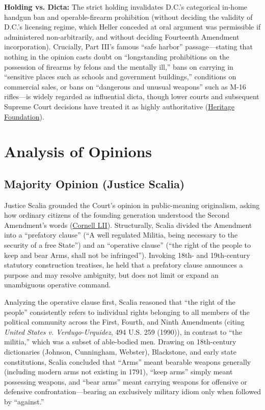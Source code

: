 \documentclass[12pt]{article}
\begin{document}
\textbf{Holding vs. Dicta:} The strict holding invalidates D.C.'s categorical in-home handgun ban and operable-firearm prohibition (without deciding the validity of D.C.'s licensing regime, which Heller conceded at oral argument was permissible if administered non-arbitrarily, and without deciding Fourteenth Amendment incorporation). Crucially, Part III's famous ``safe harbor'' passage---stating that nothing in the opinion casts doubt on ``longstanding prohibitions on the possession of firearms by felons and the mentally ill,'' bans on carrying in ``sensitive places such as schools and government buildings,'' conditions on commercial sales, or bans on ``dangerous and unusual weapons'' such as M-16 rifles---is widely regarded as influential dicta, though lower courts and subsequent Supreme Court decisions have treated it as highly authoritative (\href{https://www.heritage.org/courts/report/long-standing-and-presumptively-lawful-hellers-dicta-vs-history-and-dicta}{Heritage Foundation}).

\section{Analysis of Opinions}

\subsection{Majority Opinion (Justice Scalia)}
Justice Scalia grounded the Court's opinion in public-meaning originalism, asking how ordinary citizens of the founding generation understood the Second Amendment's words (\href{https://www.law.cornell.edu/supct/html/07-290.ZO.html}{Cornell LII}). Structurally, Scalia divided the Amendment into a ``prefatory clause'' (``A well regulated Militia, being necessary to the security of a free State'') and an ``operative clause'' (``the right of the people to keep and bear Arms, shall not be infringed''). Invoking 18th- and 19th-century statutory construction treatises, he held that a prefatory clause announces a purpose and may resolve ambiguity, but does not limit or expand an unambiguous operative command.

Analyzing the operative clause first, Scalia reasoned that ``the right of the people'' consistently refers to individual rights belonging to all members of the political community across the First, Fourth, and Ninth Amendments (citing \textit{United States v. Verdugo-Urquidez}, 494 U.S. 259 (1990)), in contrast to ``the militia,'' which was a subset of able-bodied men. Drawing on 18th-century dictionaries (Johnson, Cunningham, Webster), Blackstone, and early state constitutions, Scalia concluded that ``Arms'' meant bearable weapons generally (including modern arms not existing in 1791), ``keep arms'' simply meant possessing weapons, and ``bear arms'' meant carrying weapons for offensive or defensive confrontation---bearing an exclusively military idiom only when followed by ``against.''
\end{document}
